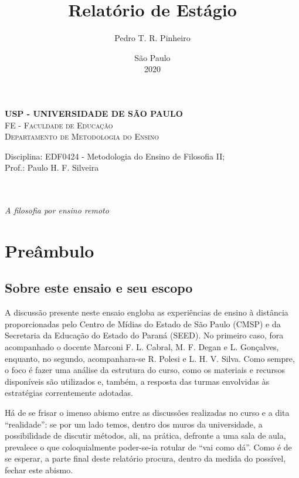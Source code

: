\documentclass[12pt,a4paper]{article}
\author{Pedro T. R. Pinheiro}
\date{São Paulo\\2020}
\title{Relatório de Estágio}
\newcommand{\subtitulo}{A filosofia por ensino remoto}
\newcommand{\disciplina}{EDF0424 - Metodologia do Ensino de Filosofia II}
\newcommand{\departamento}{Departamento de Metodologia do Ensino}
\newcommand{\unidade}{FE - Faculdade de Educação}
\newcommand{\prof}{Paulo H. F. Silveira}
\begin{document}
	\begin{center}
				\textbf{
				\LARGE USP - UNIVERSIDADE DE SÃO PAULO \\
			}
			\Large \textsc{\unidade} \\
			\large \textsc{\departamento}\\
			\vspace*{1cm}
				
			Disciplina: \disciplina; \\Prof.: \prof
			\vfill
			\begin{center}
				{\Large \textsc{\theauthor}} \\ 
				\vspace{1cm}
				\LARGE\textbf{\thetitle} \\
				\Large\emph{\subtitulo}
			\end{center}
			\vfill
			\large\thedate
			\vspace*{1cm}
			\thispagestyle{empty}			
	\end{center}

	\newpage

	\setlength{\parskip}{0.5cm}
	\setlength{\parindent}{1.1cm}
	\onehalfspacing
	
	\section{Preâmbulo}

	\subsection{Sobre este ensaio e seu escopo}

	A discussão presente neste ensaio engloba as experiências de ensino 
	à distância proporcionadas pelo Centro de Mídias do Estado de 
	São Paulo (CMSP) e da Secretaria da Educação do Estado do Paraná 
	(SEED). No primeiro caso, fora acompanhado o docente Marconi F. L. 
	Cabral, M. F. Degan e L. Gonçalves, enquanto, no segundo, 
	acompanhara-se 	R. Polesi e L. H. V. Silva. Como sempre, o foco é 
	fazer uma análise da estrutura do curso, como os materiais e recursos 
	disponíveis são utilizados e, também, a resposta das turmas envolvidas 
	às estratégias 	correntemente adotadas. 
	
	Há de se frisar o imenso abismo entre as discussões realizadas no curso 
	e a dita ``realidade'': se por um lado temos, dentro dos muros da 
	universidade, a possibilidade de discutir métodos, ali, na prática, 
	defronte a uma sala de aula, prevalece o que coloquialmente poder-se-ia 
	rotular de ``vai como dá''. Como é de se esperar, a parte final deste 
	relatório procura, dentro da medida do possível, fechar este abismo. 
	
\end{document}
